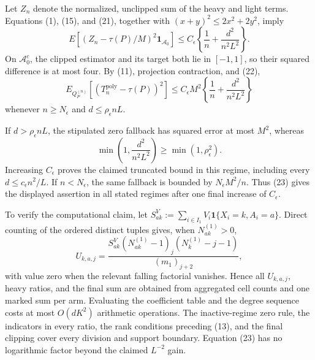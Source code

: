 Let \(Z_n\) denote the normalized, unclipped sum of the heavy and light terms.  Equations (1), (15), and (21), together with \((x+y)^2\le2x^2+2y^2\), imply
\[
 E\left[(Z_n-\tau(P)/M)^2\mathbf 1_{\mathcal A_0}\right]
 \le C_\epsilon\left\{\frac1n+\frac{d^2}{n^2L^2}\right\}.                 \tag{22}
\]
On \(\mathcal A_0^c\), the clipped estimator and its target both lie in \([-1,1]\), so their squared difference is at most four.  By (11), projection contraction, and (22),
\[
 E_{Q_P^{(n)}}[(T_n^{\mathrm{poly}}-\tau(P))^2]
 \le C_\epsilon M^2\left\{\frac1n+\frac{d^2}{n^2L^2}\right\}              \tag{23}
\]
whenever \(n\ge N_\epsilon\) and \(d\le\rho_\epsilon nL\).

If \(d>\rho_\epsilon nL\), the stipulated zero fallback has squared error at most \(M^2\), whereas
\[
 \min\left(1,\frac{d^2}{n^2L^2}\right)\ge\min(1,\rho_\epsilon^2).
\]
Increasing \(C_\epsilon\) proves the claimed truncated bound in this regime, including every \(d\le c_\epsilon n^2/L\).  If \(n<N_\epsilon\), the same fallback is bounded by \(N_\epsilon M^2/n\).  Thus (23) gives the displayed assertion in all stated regimes after one final increase of \(C_\epsilon\).

To verify the computational claim, let \(S_{ak}^{V}:=\sum_{i\in I_1}V_i\mathbf 1\{X_i=k,A_i=a\}\).  Direct counting of the ordered distinct tuples gives, when \(N_{ak}^{(1)}>0\),
\[
 U_{k,a,j}=\frac{S_{ak}^{V}(N_{ak}^{(1)}-1)_j
 (N_k^{(1)}-j-1)}{(m_1)_{j+2}},                                                 \tag{24}
\]
with value zero when the relevant falling factorial vanishes.  Hence all \(U_{k,a,j}\), heavy ratios, and the final sum are obtained from aggregated cell counts and one marked sum per arm.  Evaluating the coefficient table and the degree sequence costs at most \(O(dK^2)\) arithmetic operations.  The inactive-regime zero rule, the indicators in every ratio, the rank conditions preceding (13), and the final clipping cover every division and support boundary.  Equation (23) has no logarithmic factor beyond the claimed \(L^{-2}\) gain.
